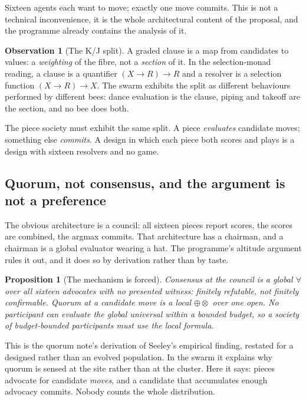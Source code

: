 \documentclass[11pt,a4paper]{article}
\theoremstyle{plain}
\newtheorem{proposition}[theorem]{Proposition}
\theoremstyle{definition}
\newtheorem{observation}[theorem]{Observation}
\theoremstyle{remark}
\begin{document}
Sixteen agents each want to move; exactly one move commits. This is not a
technical inconvenience, it is the whole architectural content of the proposal,
and the programme already contains the analysis of it.

\begin{observation}[The K/J split]
\label{obs:kj}
A graded clause is a map from candidates to values: a \emph{weighting} of the
fibre, not a \emph{section} of it. In the selection-monad reading, a clause is a
quantifier $(X \to R) \to R$ and a resolver is a selection function
$(X \to R) \to X$. The swarm exhibits the split as different behaviours
performed by different bees: dance evaluation is the clause, piping and takeoff
are the section, and no bee does both.

The piece society must exhibit the same split. A piece \emph{evaluates}
candidate moves; something else \emph{commits}. A design in which each piece
both scores and plays is a design with sixteen resolvers and no game.
\end{observation}

\subsection{Quorum, not consensus, and the argument is not a preference}

The obvious architecture is a council: all sixteen pieces report scores, the
scores are combined, the argmax commits. That architecture has a chairman, and a
chairman is a global evaluator wearing a hat. The programme's altitude argument
rules it out, and it does so by derivation rather than by taste.

\begin{proposition}[The mechanism is forced]
\label{prop:forced}
Consensus at the council is a global $\forall$ over all sixteen advocates with
no presented witness: finitely refutable, not finitely confirmable. Quorum at a
candidate move is a local $\oplus\otimes$ over one open. No participant can
evaluate the global universal within a bounded budget, so a society of
budget-bounded participants must use the local formula.
\end{proposition}

This is the quorum note's derivation of Seeley's empirical finding, restated for
a designed rather than an evolved population. In the swarm it explains why
quorum is sensed at the site rather than at the cluster. Here it says: pieces
advocate for candidate \emph{moves}, and a candidate that accumulates enough
advocacy commits. Nobody counts the whole distribution.
\end{document}
